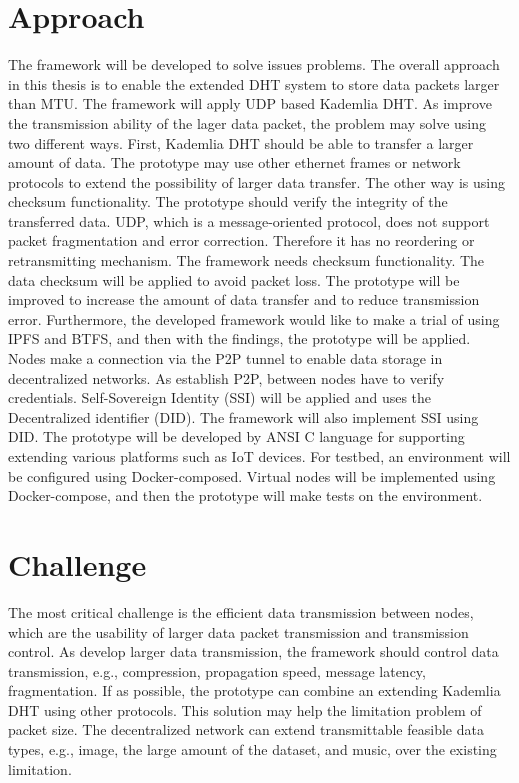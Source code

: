 \documentclass{article}
\begin{document}
\section{Approach}

The framework will be developed to solve issues problems. The overall approach in this thesis is to enable the extended DHT system to store data packets larger than MTU. The framework will apply UDP based Kademlia DHT. As improve the transmission ability of the lager data packet, the problem may solve using two different ways. First, Kademlia DHT should be able to transfer a larger amount of data. The prototype may use other ethernet frames or network protocols to extend the possibility of larger data transfer. The other way is using checksum functionality. The prototype should verify the integrity of the transferred data. UDP, which is a message-oriented protocol, does not support packet fragmentation and error correction. Therefore it has no reordering or retransmitting mechanism. The framework needs checksum functionality. The data checksum will be applied to avoid packet loss. The prototype will be improved to increase the amount of data transfer and to reduce transmission error. Furthermore, the developed framework would like to make a trial of using IPFS and BTFS, and then with the findings, the prototype will be applied. Nodes make a connection via the P2P tunnel to enable data storage in decentralized networks. As establish P2P, between nodes have to verify credentials. Self-Sovereign Identity (SSI)\cite{tobin2016inevitable} will be applied and uses the Decentralized identifier (DID)\cite{sabadello2018introduction}. The framework will also implement SSI using DID. The prototype will be developed by ANSI C language for supporting extending various platforms such as IoT devices. For testbed, an environment will be configured using Docker-composed. Virtual nodes will be implemented using Docker-compose, and then the prototype will make tests on the environment.


\section{Challenge}
The most critical challenge is the efficient data transmission between nodes, which are the usability of larger data packet transmission and transmission control. As develop larger data transmission, the framework should control data transmission, e.g., compression, propagation speed, message latency, fragmentation. If as possible, the prototype can combine an extending Kademlia DHT using other protocols. This solution may help the limitation problem of packet size. The decentralized network can extend transmittable feasible data types, e.g., image, the large amount of the dataset, and music, over the existing limitation.
\end{document}
